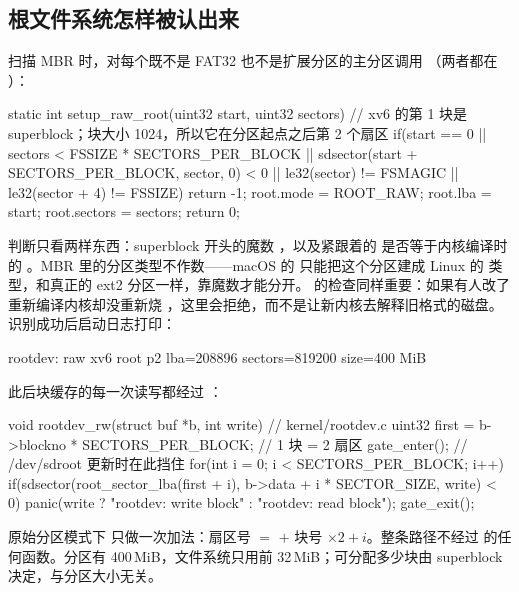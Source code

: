 \subsection{根文件系统怎样被认出来}

 扫描 MBR 时，对每个既不是 FAT32 也不是扩展分区的主分区调用 （两者都在 ）：

\begin{ccode}
static int setup_raw_root(uint32 start, uint32 sectors) {
  // xv6 的第 1 块是 superblock；块大小 1024，所以它在分区起点之后第 2 个扇区
  if(start == 0 || sectors < FSSIZE * SECTORS_PER_BLOCK ||
     sdsector(start + SECTORS_PER_BLOCK, sector, 0) < 0 ||
     le32(sector) != FSMAGIC || le32(sector + 4) != FSSIZE)
    return -1;
  root.mode = ROOT_RAW;
  root.lba = start;
  root.sectors = sectors;
  return 0;
}
\end{ccode}

判断只看两样东西：superblock 开头的魔数 ，以及紧跟着的  是否等于内核编译时的 。MBR 里的分区类型不作数——macOS 的  只能把这个分区建成 Linux 的  类型，和真正的 ext2 分区一样，靠魔数才能分开。 的检查同样重要：如果有人改了  重新编译内核却没重新烧 ，这里会拒绝，而不是让新内核去解释旧格式的磁盘。识别成功后启动日志打印：

\begin{txtcode}
rootdev: raw xv6 root p2 lba=208896 sectors=819200 size=400 MiB
\end{txtcode}

此后块缓存的每一次读写都经过 ：

\begin{ccode}
void rootdev_rw(struct buf *b, int write) {         // kernel/rootdev.c
  uint32 first = b->blockno * SECTORS_PER_BLOCK;    // 1 块 = 2 扇区
  gate_enter();                                     // /dev/sdroot 更新时在此挡住
  for(int i = 0; i < SECTORS_PER_BLOCK; i++)
    if(sdsector(root_sector_lba(first + i),
                b->data + i * SECTOR_SIZE, write) < 0)
      panic(write ? "rootdev: write block" : "rootdev: read block");
  gate_exit();
}
\end{ccode}

原始分区模式下  只做一次加法：扇区号 $=$  $+$ 块号 $\times 2 + i$。整条路径不经过  的任何函数。分区有 400\,MiB，文件系统只用前 32\,MiB；可分配多少块由 superblock 决定，与分区大小无关。

